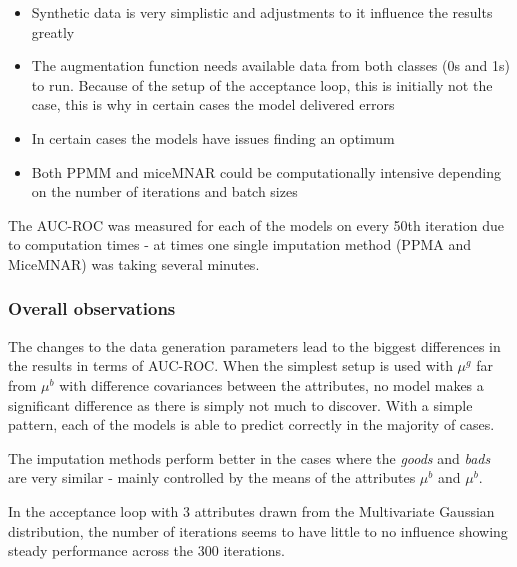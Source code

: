 \documentclass[11pt,a4paper]{article}
\begin{document}
\begin{itemize}
  \item Synthetic data is very simplistic and adjustments to it influence the results greatly
  \item  The augmentation function needs available data from both classes (0s and 1s) to run. Because of the setup of the acceptance loop, this is initially not the case, this is why in certain cases the model delivered errors
  \item In certain cases the models have issues finding an optimum
  \item Both PPMM and miceMNAR could be computationally intensive depending on the number of iterations and batch sizes
\end{itemize}

The AUC-ROC was measured for each of the models on every 50th iteration due to computation times - at times one single imputation method (PPMA and MiceMNAR) was taking several minutes. 

\subsubsection{Overall observations}

The changes to the data generation parameters lead to the biggest differences in the results in terms of AUC-ROC. When the simplest setup is used with $\mu^g$ far from $\mu^b$ with difference covariances between the attributes, no model makes a significant difference as there is simply not much to discover. With a simple pattern, each of the models is able to predict correctly in the majority of cases. 



The imputation methods perform better in the cases where the \textit{goods} and \textit{bads} are very similar - mainly controlled by the means of the attributes $\mu^b$ and $\mu^b$. 


In the acceptance loop with 3 attributes drawn from the Multivariate Gaussian distribution, the number of iterations seems to have little to no influence showing steady performance across the 300 iterations.

\end{document}
